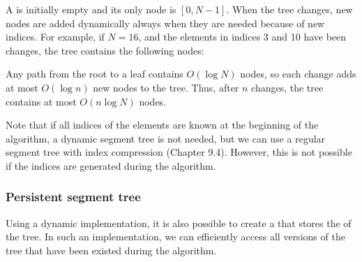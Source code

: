 A  is initially empty
and its only node is $[0,N-1]$.
When the tree changes, new nodes are added dynamically
always when they are needed because of new indices.
For example, if $N=16$, and the elements
in indices 3 and 10 have been changes,
the tree contains the following nodes:
\begin{center}
\end{center}

Any path from the root to a leaf contains
$O(\log N)$ nodes,
so each change adds at most $O(\log n)$
new nodes to the tree.
Thus, after $n$ changes, the tree contains
at most $O(n \log N)$ nodes.

Note that if all indices of the elements
are known at the beginning of the algorithm,
a dynamic segment tree is not needed,
but we can use a regular segment tree with
index compression (Chapter 9.4).
However, this is not possible if the indices
are generated during the algorithm.

\subsubsection{Persistent segment tree}


Using a dynamic implementation,
it is also possible to create a
 that stores
the  of the tree.
In such an implementation, we can
efficiently access
all versions of the tree that have been
existed during the algorithm.


